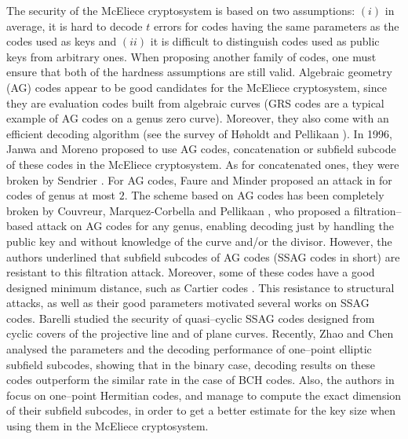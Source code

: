 \documentclass[a4paper]{amsart}
\theoremstyle{definition}
\theoremstyle{remark}
\begin{document}
The security of the McEliece cryptosystem is based on two assumptions: $(i)$ in average, it is hard to decode $t$ errors for codes having the same parameters as the codes used as keys and $(ii)$ it is difficult to distinguish codes used as public keys from arbitrary ones. When proposing another family of codes, one must ensure that both of the hardness assumptions are still valid.
Algebraic geometry (AG) codes appear to be good candidates for the McEliece cryptosystem, since they are evaluation codes built from algebraic curves (GRS codes are a typical example of AG codes on a genus zero curve). Moreover, they also come with an efficient decoding algorithm (see the survey of H\o holdt and Pellikaan \cite{HP95}).
In 1996, Janwa and Moreno \cite{JM96} proposed to use AG codes, concatenation or subfield subcode of these codes in the McEliece cryptosystem. As for concatenated ones, they were broken by Sendrier \cite{Sen94}. For AG codes, Faure and Minder proposed an attack in \cite{FM08,Min07,Fau09} for codes of genus at most $2$. The scheme based on AG codes has been completely broken by Couvreur, Marquez-Corbella and Pellikaan \cite{CMR17}, who proposed a filtration--based attack on AG codes for any genus, enabling decoding just by handling the public key and without knowledge of the curve and/or the divisor. However, the authors underlined that subfield subcodes of AG codes (SSAG codes in short) are resistant to this filtration attack. Moreover, some of these codes have a good designed minimum distance, such as Cartier codes \cite{Cou14}. This resistance to structural attacks, as well as their good parameters motivated several works on SSAG codes. Barelli \cite{B18} studied the security of quasi--cyclic SSAG codes designed from cyclic covers of the projective line and of plane curves. Recently, Zhao and Chen \cite{ZC22} analysed the parameters and the decoding performance of one--point elliptic subfield subcodes, showing that in the binary case, decoding results on these codes outperform the similar rate in the case of BCH codes. Also, the authors in \cite{PJ14,EKN21} focus on one--point Hermitian codes, and manage to compute the exact dimension of their subfield subcodes, in order to get a better estimate for the key size when using them in the McEliece cryptosystem.
\end{document}
